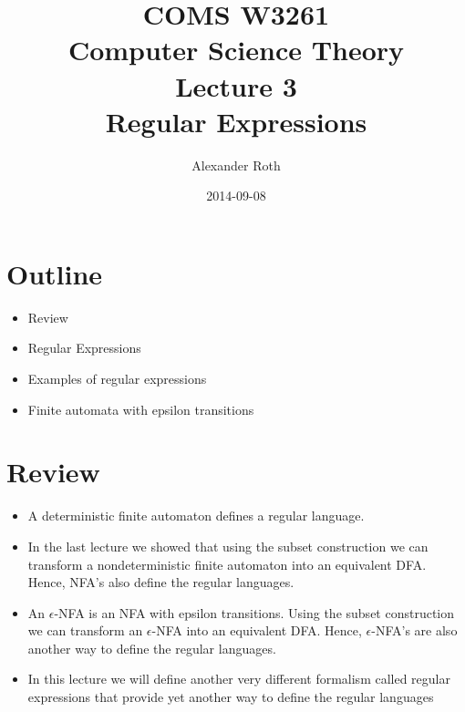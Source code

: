 \documentclass[]{article}
\begin{document}
\title{COMS W3261 \\ Computer Science Theory \\ Lecture 3\\ Regular Expressions}
\author{Alexander Roth}
\date{2014-09-08}
\maketitle

\section*{Outline}
  \begin{itemize}
    \item Review
    \item Regular Expressions
    \item Examples of regular expressions
    \item Finite automata with epsilon transitions
  \end{itemize}

\section{Review}
  \begin{itemize}
    \item A deterministic finite automaton defines a regular language.
    \item In the last lecture we showed that using the subset construction we
          can transform a nondeterministic finite automaton into an equivalent
          DFA. Hence, NFA's also define the regular languages.
    \item An $\epsilon$-NFA is an NFA with epsilon transitions. Using the subset
          construction we can transform an $\epsilon$-NFA into an equivalent
          DFA. Hence, $\epsilon$-NFA's are also another way to define the
          regular languages.
    \item In this lecture we will define another very different formalism called
          regular expressions that provide yet another way to define the regular
          languages
  \end{itemize}
\end{document}

